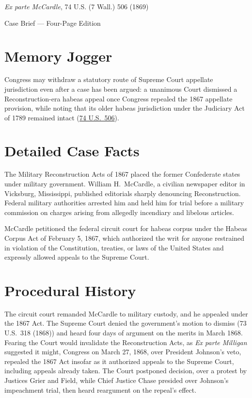 \documentclass[12pt]{article}
\begin{document}
\begin{center}
{\LARGE \textit{Ex parte McCardle}, 74 U.S. (7 Wall.) 506 (1869)\par}
\vspace{0.8em}
{\large Case Brief --- Four-Page Edition\par}
\end{center}
\vspace{1em}

\section{Memory Jogger}

Congress may withdraw a statutory route of Supreme Court appellate jurisdiction even after a case has been argued: a unanimous Court dismissed a Reconstruction-era habeas appeal once Congress repealed the 1867 appellate provision, while noting that its older habeas jurisdiction under the Judiciary Act of 1789 remained intact (\href{https://supreme.justia.com/cases/federal/us/74/506/}{74 U.S.\ 506}).

\section{Detailed Case Facts}

The Military Reconstruction Acts of 1867 placed the former Confederate states under military government. William H.\ McCardle, a civilian newspaper editor in Vicksburg, Mississippi, published editorials sharply denouncing Reconstruction. Federal military authorities arrested him and held him for trial before a military commission on charges arising from allegedly incendiary and libelous articles.

McCardle petitioned the federal circuit court for habeas corpus under the Habeas Corpus Act of February 5, 1867, which authorized the writ for anyone restrained in violation of the Constitution, treaties, or laws of the United States and expressly allowed appeals to the Supreme Court.

\section{Procedural History}

The circuit court remanded McCardle to military custody, and he appealed under the 1867 Act. The Supreme Court denied the government's motion to dismiss (73 U.S.\ 318 (1868)) and heard four days of argument on the merits in March 1868. Fearing the Court would invalidate the Reconstruction Acts, as \textit{Ex parte Milligan} suggested it might, Congress on March 27, 1868, over President Johnson's veto, repealed the 1867 Act insofar as it authorized appeals to the Supreme Court, including appeals already taken. The Court postponed decision, over a protest by Justices Grier and Field, while Chief Justice Chase presided over Johnson's impeachment trial, then heard reargument on the repeal's effect.
\end{document}
